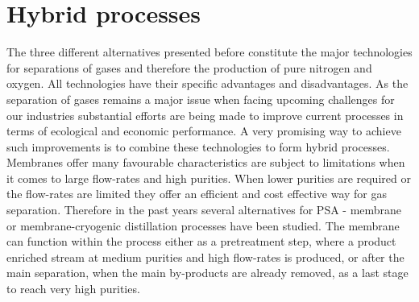     \section{Hybrid processes}
    The three different alternatives presented before constitute the major technologies for separations
    of gases and therefore the production of pure nitrogen and oxygen. All technologies have their specific
    advantages and disadvantages. As the separation of gases remains a major issue when facing upcoming challenges
    for our industries substantial efforts are being made to improve current processes in terms of ecological
    and economic performance. A very promising way to achieve such improvements is to combine these technologies
    to form hybrid processes. Membranes offer many favourable characteristics are subject to limitations when
    it comes to large flow-rates and high purities. When lower purities are required or the flow-rates are limited
    they offer an efficient and cost effective way for gas separation. Therefore in the past years several
    alternatives for PSA - membrane \cite{Akinlabi.2007} or membrane-cryogenic distillation processes \cite{Wankat.2011}
    have been studied. The membrane can function within the process either as a pretreatment step, where a product enriched
    stream at medium purities and high flow-rates is produced, or after the main separation, when the main
    by-products are already removed, as a last stage to reach very high purities.

